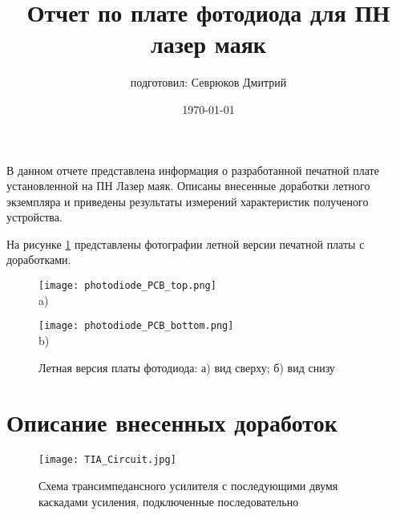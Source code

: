 

\title{Отчет по плате фотодиода для ПН лазер маяк}
\author{подготовил: Севрюков Дмитрий}
\date{\today}



\maketitle

\newpage
В данном отчете представлена информация 
о разработанной печатной плате установленной 
на ПН Лазер маяк. Описаны внесенные доработки 
летного экземпляра и приведены результаты измерений
характеристик полученого устройства.

На рисунке \ref{fig:photodiode_PCB} представлены 
фотографии летной версии печатной платы с доработками.

\begin{figure}[h]
    \centering

    \begin{minipage}{0.45\textwidth}
        \centering
        \texttt{[image: photodiode\_PCB\_top.png]}
        \\ a)
    \end{minipage}
    \hfill
    \begin{minipage}{0.45\textwidth}
        \centering
        \texttt{[image: photodiode\_PCB\_bottom.png]}
        \\ b)
    \end{minipage}

    \caption{Летная версия платы фотодиода: а) вид сверху; б) вид снизу}
    \label{fig:photodiode_PCB}

\end{figure}

\section*{Описание внесенных доработок}

\begin{figure}[h]
    \centering
    \texttt{[image: TIA\_Circuit.jpg]}
    \caption{Схема трансимпедансного усилителя с последующими 
    двумя каскадами усиления, подключенные последовательно}
    \label{fig:TIA_Circuit}
\end{figure}

